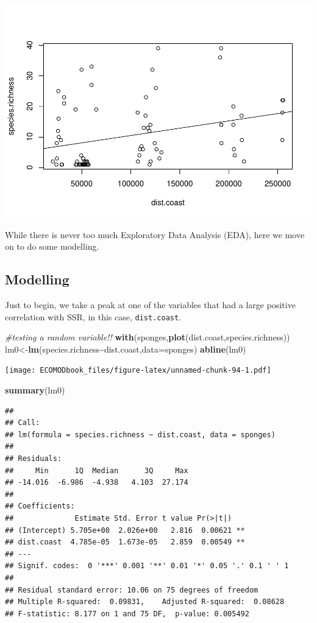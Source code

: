 \documentclass[
]{book}
\newenvironment{Shaded}{\begin{snugshade}}{\end{snugshade}}
\newcommand{\AttributeTok}[1]{\textcolor[rgb]{0.13,0.29,0.53}{#1}}
\newcommand{\CommentTok}[1]{\textcolor[rgb]{0.56,0.35,0.01}{\textit{#1}}}
\newcommand{\FunctionTok}[1]{\textcolor[rgb]{0.13,0.29,0.53}{\textbf{#1}}}
\newcommand{\NormalTok}[1]{#1}
\newcommand{\OtherTok}[1]{\textcolor[rgb]{0.56,0.35,0.01}{#1}}
\newcommand{\SpecialCharTok}[1]{\textcolor[rgb]{0.81,0.36,0.00}{\textbf{#1}}}
\begin{document}
\includegraphics{ECOMODbook_files/figure-latex/unnamed-chunk-93-1.pdf}

While there is never too much Exploratory Data Analysis (EDA), here we move on to do some modelling.

\subsection{Modelling}\label{modelling}

Just to begin, we take a peak at one of the variables that had a large positive correlation with SSR, in this case, \texttt{dist.coast}.

\begin{Shaded}
\begin{Highlighting}[]
\CommentTok{\#testing a random variable!!}
\FunctionTok{with}\NormalTok{(sponges,}\FunctionTok{plot}\NormalTok{(dist.coast,species.richness))}
\NormalTok{lm0}\OtherTok{\textless{}{-}}\FunctionTok{lm}\NormalTok{(species.richness}\SpecialCharTok{\textasciitilde{}}\NormalTok{dist.coast,}\AttributeTok{data=}\NormalTok{sponges)}
\FunctionTok{abline}\NormalTok{(lm0)}
\end{Highlighting}
\end{Shaded}

\texttt{[image: ECOMODbook\_files/figure-latex/unnamed-chunk-94-1.pdf]}

\begin{Shaded}
\begin{Highlighting}[]
\FunctionTok{summary}\NormalTok{(lm0)}
\end{Highlighting}
\end{Shaded}

\begin{verbatim}
## 
## Call:
## lm(formula = species.richness ~ dist.coast, data = sponges)
## 
## Residuals:
##     Min      1Q  Median      3Q     Max 
## -14.016  -6.986  -4.938   4.103  27.174 
## 
## Coefficients:
##              Estimate Std. Error t value Pr(>|t|)   
## (Intercept) 5.705e+00  2.026e+00   2.816  0.00621 **
## dist.coast  4.785e-05  1.673e-05   2.859  0.00549 **
## ---
## Signif. codes:  0 '***' 0.001 '**' 0.01 '*' 0.05 '.' 0.1 ' ' 1
## 
## Residual standard error: 10.06 on 75 degrees of freedom
## Multiple R-squared:  0.09831,    Adjusted R-squared:  0.08628 
## F-statistic: 8.177 on 1 and 75 DF,  p-value: 0.005492
\end{verbatim}
\end{document}

